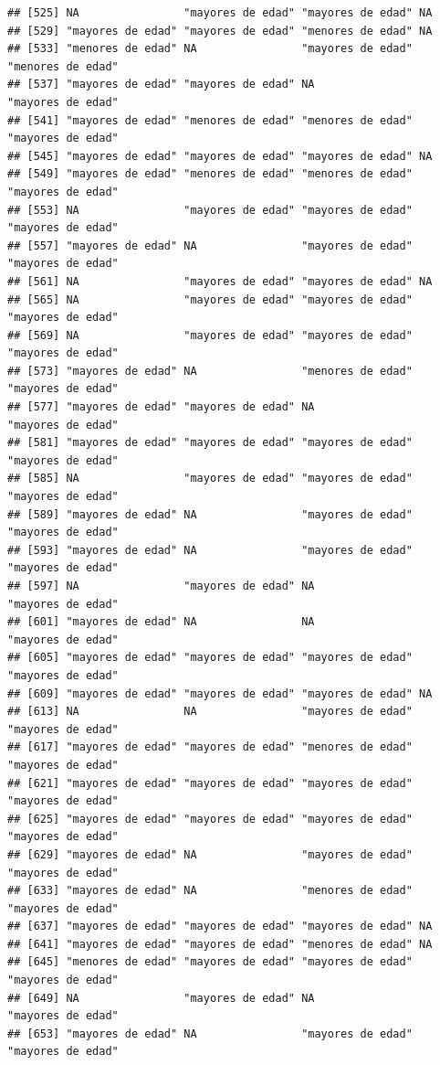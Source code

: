 \documentclass[11pt,]{book}
\begin{document}
\begin{verbatim}
## [525] NA                "mayores de edad" "mayores de edad" NA               
## [529] "mayores de edad" "mayores de edad" "menores de edad" NA               
## [533] "menores de edad" NA                "mayores de edad" "menores de edad"
## [537] "mayores de edad" "mayores de edad" NA                "mayores de edad"
## [541] "mayores de edad" "menores de edad" "menores de edad" "mayores de edad"
## [545] "mayores de edad" "mayores de edad" "mayores de edad" NA               
## [549] "mayores de edad" "menores de edad" "menores de edad" "mayores de edad"
## [553] NA                "mayores de edad" "mayores de edad" "mayores de edad"
## [557] "mayores de edad" NA                "mayores de edad" "mayores de edad"
## [561] NA                "mayores de edad" "mayores de edad" NA               
## [565] NA                "mayores de edad" "mayores de edad" "mayores de edad"
## [569] NA                "mayores de edad" "mayores de edad" "mayores de edad"
## [573] "mayores de edad" NA                "menores de edad" "mayores de edad"
## [577] "mayores de edad" "mayores de edad" NA                "mayores de edad"
## [581] "mayores de edad" "mayores de edad" "mayores de edad" "mayores de edad"
## [585] NA                "mayores de edad" "mayores de edad" "mayores de edad"
## [589] "mayores de edad" NA                "mayores de edad" "mayores de edad"
## [593] "mayores de edad" NA                "mayores de edad" "mayores de edad"
## [597] NA                "mayores de edad" NA                "mayores de edad"
## [601] "mayores de edad" NA                NA                "mayores de edad"
## [605] "mayores de edad" "mayores de edad" "mayores de edad" "mayores de edad"
## [609] "mayores de edad" "mayores de edad" "mayores de edad" NA               
## [613] NA                NA                "mayores de edad" "mayores de edad"
## [617] "mayores de edad" "mayores de edad" "menores de edad" "mayores de edad"
## [621] "mayores de edad" "mayores de edad" "mayores de edad" "mayores de edad"
## [625] "mayores de edad" "mayores de edad" "mayores de edad" "mayores de edad"
## [629] "mayores de edad" NA                "mayores de edad" "mayores de edad"
## [633] "mayores de edad" NA                "menores de edad" "mayores de edad"
## [637] "mayores de edad" "mayores de edad" "mayores de edad" NA               
## [641] "mayores de edad" "mayores de edad" "menores de edad" NA               
## [645] "menores de edad" "mayores de edad" "mayores de edad" "mayores de edad"
## [649] NA                "mayores de edad" NA                "mayores de edad"
## [653] "mayores de edad" NA                "mayores de edad" "mayores de edad"

\end{verbatim}
\end{document}
